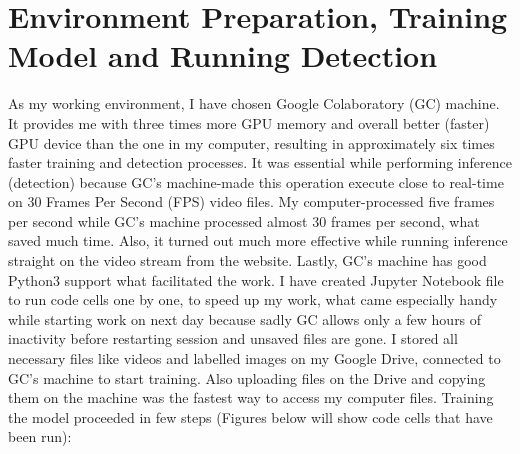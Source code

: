 \section{Environment Preparation, Training Model and Running Detection}
\label{sec:env}
As my working environment, I have chosen Google Colaboratory (GC) machine. It provides me with three times more GPU memory and overall better (faster) GPU device than the one in my computer, resulting in approximately six times faster training and detection processes. It was essential while performing inference (detection) because GC's machine-made this operation execute close to real-time on 30 Frames Per Second (FPS) video files. My computer-processed five frames per second while GC's machine processed almost 30 frames per second, what saved much time. Also, it turned out much more effective while running inference straight on the video stream from the website. Lastly, GC's machine has good Python3 support what facilitated the work. I have created Jupyter Notebook file to run code cells one by one, to speed up my work, what came especially handy while starting work on next day because sadly GC allows only a few hours of inactivity before restarting session and unsaved files are gone. I stored all necessary files like videos and labelled images on my Google Drive, connected to GC's machine to start training. Also uploading files on the Drive and copying them on the machine was the fastest way to access my computer files. Training the model proceeded in few steps (Figures below will show code cells that have been run):
